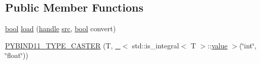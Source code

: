 \subsection*{Public Member Functions}
\begin{DoxyCompactItemize}
\item 
\mbox{\hyperlink{asdl_8h_af6a258d8f3ee5206d682d799316314b1}{bool}} \mbox{\hyperlink{structtype__caster_3_01_t_00_01enable__if__t_3_01std_1_1is__arithmetic_3_01_t_01_4_1_1value_01_624f9972c532456d927e4470192416960_acad49e0860c8d2cc010f7368592ff963}{load}} (\mbox{\hyperlink{classhandle}{handle}} \mbox{\hyperlink{_s_d_l__opengl__glext_8h_a72e0fdf0f845ded60b1fada9e9195cd7}{src}}, \mbox{\hyperlink{asdl_8h_af6a258d8f3ee5206d682d799316314b1}{bool}} convert)
\item 
\mbox{\hyperlink{structtype__caster_3_01_t_00_01enable__if__t_3_01std_1_1is__arithmetic_3_01_t_01_4_1_1value_01_624f9972c532456d927e4470192416960_a96a4ee7b970f83b35e0f695a0e00b2bd}{P\+Y\+B\+I\+N\+D11\+\_\+\+T\+Y\+P\+E\+\_\+\+C\+A\+S\+T\+ER}} (T, \mbox{\hyperlink{descr_8h_af114703e20c6527e87163eb2798f74b8}{\+\_\+}}$<$ std\+::is\+\_\+integral$<$ T $>$\+::\mbox{\hyperlink{_s_d_l__opengl__glext_8h_a8ad81492d410ff2ac11f754f4042150f}{value}} $>$(\char`\"{}int\char`\"{}, \char`\"{}float\char`\"{}))
\end{DoxyCompactItemize}
